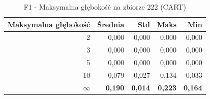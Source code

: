\begin{table}[htbp]
\centering
\small
\setlength{\tabcolsep}{6pt}
\renewcommand{\arraystretch}{1.2}
\caption{F1 - Maksymalna głębokość na zbiorze 222 (CART)}
\label{tab:CART_max_depth_222_f1}
\begin{tabular}{r|r|r|r|r}
\toprule
Maksymalna głębokość & Średnia & Std & Maks & Min \\
\hline
2 & 0,000 & 0,000 & 0,000 & 0,000 \\
3 & 0,000 & 0,000 & 0,000 & 0,000 \\
5 & 0,000 & 0,000 & 0,000 & 0,000 \\
10 & 0,079 & 0,027 & 0,134 & 0,033 \\
\textbf{$\infty$} & \textbf{0,190} & \textbf{0,014} & \textbf{0,223} & \textbf{0,164} \\
\bottomrule
\end{tabular}
\end{table}